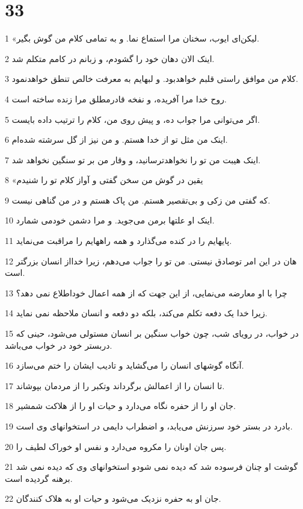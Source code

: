 \chapter{33}

\par 1 «لیکن‌ای ایوب، سخنان مرا استماع نما. و به تمامی کلام من گوش بگیر.
\par 2 اینک الان دهان خود را گشودم، و زبانم در کامم متکلم شد.
\par 3 کلام من موافق راستی قلبم خواهدبود. و لبهایم به معرفت خالص تنطق خواهدنمود.
\par 4 روح خدا مرا آفریده، و نفخه قادرمطلق مرا زنده ساخته است.
\par 5 اگر می‌توانی مرا جواب ده، و پیش روی من، کلام را ترتیب داده بایست.
\par 6 اینک من مثل تو از خدا هستم. و من نیز از گل سرشته شده‌ام.
\par 7 اینک هیبت من تو را نخواهدترسانید، و وقار من بر تو سنگین نخواهد شد.
\par 8 «یقین در گوش من سخن گفتی و آواز کلام تو را شنیدم
\par 9 که گفتی من زکی و بی‌تقصیر هستم. من پاک هستم و در من گناهی نیست.
\par 10 اینک او علتها برمن می‌جوید. و مرا دشمن خودمی شمارد.
\par 11 پایهایم را در کنده می‌گذارد و همه راههایم را مراقبت می‌نماید.
\par 12 هان در این امر توصادق نیستی. من تو را جواب می‌دهم، زیرا خدااز انسان بزرگتر است.
\par 13 چرا با او معارضه می‌نمایی، از این جهت که از همه اعمال خوداطلاع نمی دهد؟
\par 14 زیرا خدا یک دفعه تکلم می‌کند، بلکه دو دفعه و انسان ملاحظه نمی نماید.
\par 15 در خواب، در رویای شب، چون خواب سنگین بر انسان مستولی می‌شود، حینی که دربستر خود در خواب می‌باشد.
\par 16 آنگاه گوشهای انسان را می‌گشاید و تادیب ایشان را ختم می‌سازد.
\par 17 تا انسان را از اعمالش برگرداند وتکبر را از مردمان بپوشاند.
\par 18 جان او را از حفره نگاه می‌دارد و حیات او را از هلاکت شمشیر.
\par 19 بادرد در بستر خود سرزنش می‌یابد، و اضطراب دایمی در استخوانهای وی است.
\par 20 پس جان اونان را مکروه می‌دارد و نفس او خوراک لطیف را.
\par 21 گوشت او چنان فرسوده شد که دیده نمی شودو استخوانهای وی که دیده نمی شد برهنه گردیده است.
\par 22 جان او به حفره نزدیک می‌شود و حیات او به هلاک کنندگان.

